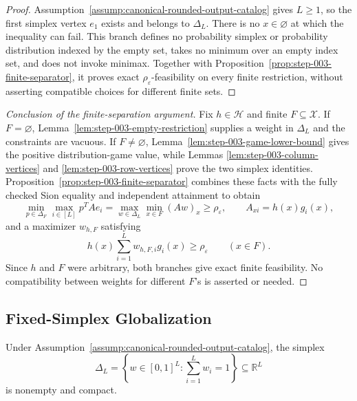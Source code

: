 \begin{proof}
Assumption~\ref{assump:canonical-rounded-output-catalog} gives \(L\ge1\), so
the first simplex vertex \(e_1\) exists and belongs to \(\Delta_L\).  There
is no \(x\in\varnothing\) at which the inequality can fail.  This branch
defines no probability simplex or probability distribution indexed by the
empty set, takes no minimum over an empty index set, and does not invoke
minimax.  Together with Proposition~\ref{prop:step-003-finite-separator}, it
proves exact \(\rho_{\varepsilon}\)-feasibility on every finite restriction,
without asserting compatible choices for different finite sets.
\end{proof}

\begin{proof}[Conclusion of the finite-separation argument]
Fix \(h\in\mathcal H\) and finite \(F\subseteq\mathcal X\).  If
\(F=\varnothing\), Lemma~\ref{lem:step-003-empty-restriction} supplies a
weight in \(\Delta_L\) and the constraints are vacuous.  If
\(F\ne\varnothing\), Lemma~\ref{lem:step-003-game-lower-bound} gives the
positive distribution-game value, while Lemmas
\ref{lem:step-003-column-vertices} and
\ref{lem:step-003-row-vertices} prove the two simplex identities.
Proposition~\ref{prop:step-003-finite-separator} combines these facts with
the fully checked Sion equality and independent attainment to obtain
\[
\min_{p\in\Delta_F}\max_{i\in[L]}p^{T}Ae_i
=\max_{w\in\Delta_L}\min_{x\in F}(Aw)_x
\ge\rho_{\varepsilon},
\qquad A_{xi}=h(x)g_i(x),
\]
and a maximizer \(w_{h,F}\) satisfying
\[
h(x)\sum_{i=1}^Lw_{h,F,i}g_i(x)
\ge\rho_{\varepsilon}
\qquad(x\in F).
\]
Since \(h\) and \(F\) were arbitrary, both branches give exact finite
feasibility.  No compatibility between weights for different \(F\)'s is
asserted or needed.
\end{proof}

\subsection{Fixed-Simplex Globalization}
\label{app:step-004}

\begin{lemma}
\label{lem:step-004-simplex-compact}
Under Assumption~\ref{assump:canonical-rounded-output-catalog}, the simplex
\[
\Delta_L=\left\{w\in[0,1]^L:\sum_{i=1}^Lw_i=1\right\}
\subseteq\mathbb R^L
\]
is nonempty and compact.
\end{lemma}

